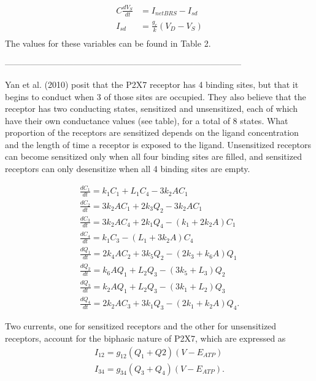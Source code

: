 \documentclass{article}
\begin{document}
\begin{align}
C\frac{dV_{S}}{dt} &= I_{net BRS} - I_{sd}\\
I_{sd} &=\frac{g_{c}}{k}(V_{D} -V_{S})\\
\end{align}
The values for these variables can be found in Table 2.




-----------------------------------------------------------------------------------


Yan et al. (2010) posit that the P2X7 receptor has 4 binding sites, but that it begins to conduct when 3 of those sites are occupied. They also believe that the receptor has two conducting states, sensitized and unsensitized, each of which have their own conductance values (see table), for a total of 8 states. What proportion of the receptors are sensitized depends on the ligand concentration and the length of time a receptor is exposed to the ligand. Unsensitized receptors can become sensitized only when all four binding sites are filled, and sensitized receptors can only desensitize when all 4 binding sites are empty.

\begin{align}
\frac{dC_{1}}{dt} = k_{1}C_{1} + L_{1}C_{4} - 3k_{2}AC_{1} \\
\frac{dC_{2}}{dt} = 3k_{2}AC_{1} + 2k_{3}Q_{2} - 3k_{2}AC_{1} \\
\frac{dC_{3}}{dt} = 3k_{2}AC_{4} + 2k_{1}Q_{4} - (k_{1} + 2k_{2}A)C_{1} \\
\frac{dC_{4}}{dt} = k_{1}C_{3} - (L_{1} + 3k_{2}A)C_{4} \\
\frac{dQ_{1}}{dt} = 2k_{4}AC_{2} + 3k_{5}Q_{2} - (2k_{3} + k_{6}A)Q_{1}\\
\frac{dQ_{2}}{dt} = k_{6}AQ_{1} + L_{2}Q_{3} - (3k_{5} + L_{3})Q_{2}\\
\frac{dQ_{3}}{dt} = k_{2}AQ_{1} + L_{2}Q_{3} - (3k_{1} + L_{2})Q_{3}\\
\frac{dQ_{4}}{dt} = 2k_{2}AC_{3} + 3k_{1}Q_{3} - (2k_{1} + k_{2}A)Q_{4}.
\end{align}

Two currents, one for sensitized receptors and the other for unsensitized receptors, account for the biphasic nature of P2X7, which are expressed as
\begin{align}
I_{12} = g_{12}(Q_{1}+Q{2})(V-E_{ATP}) \\
I_{34} = g_{34}(Q_{3}+Q_{4})(V-E_{ATP}).
\end{align}
\end{document}
